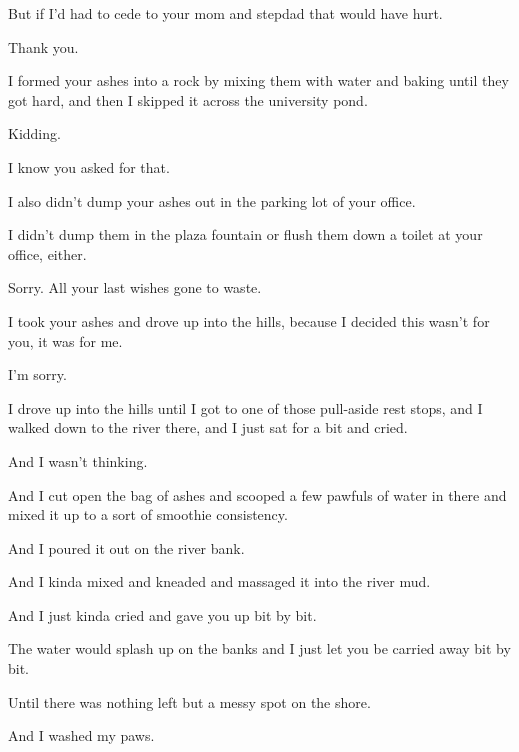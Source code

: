 { But if I'd had to cede to your mom and stepdad that would have hurt.

 Thank you.

\nopagebreak

 I formed your ashes into a rock by mixing them with water and baking until they got hard, and then I skipped it across the university pond.

 Kidding.

 I know you asked for that.

 I also didn't dump your ashes out in the parking lot of your office.

 I didn't dump them in the plaza fountain or flush them down a toilet at your office, either.

 Sorry. All your last wishes gone to waste.

 I took your ashes and drove up into the hills, because I decided this wasn't for you, it was for me.

 I'm sorry.

 I drove up into the hills until I got to one of those pull-aside rest stops, and I walked down to the river there, and I just sat for a bit and cried.

 And I wasn't thinking.

 And I cut open the bag of ashes and scooped a few pawfuls of water in there and mixed it up to a sort of smoothie consistency.

 And I poured it out on the river bank.

 And I kinda mixed and kneaded and massaged it into the river mud.

 And I just kinda cried and gave you up bit by bit.

 The water would splash up on the banks and I just let you be carried away bit by bit.

 Until there was nothing left but a messy spot on the shore.

 And I washed my paws.

}
